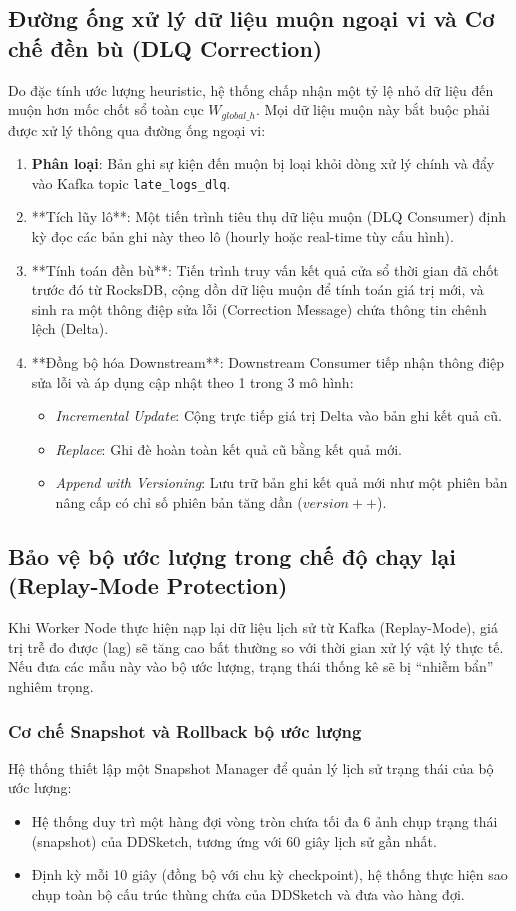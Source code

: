\documentclass[12pt,a4paper]{article}
\begin{document}
\subsection{Đường ống xử lý dữ liệu muộn ngoại vi và Cơ chế đền bù (DLQ Correction)}
Do đặc tính ước lượng heuristic, hệ thống chấp nhận một tỷ lệ nhỏ dữ liệu đến muộn hơn mốc chốt sổ toàn cục $W_{global\_h}$. Mọi dữ liệu muộn này bắt buộc phải được xử lý thông qua đường ống ngoại vi:
\begin{enumerate}
    \item \textbf{Phân loại}: Bản ghi sự kiện đến muộn bị loại khỏi dòng xử lý chính và đẩy vào Kafka topic \texttt{late\_logs\_dlq}.
    \item **Tích lũy lô**: Một tiến trình tiêu thụ dữ liệu muộn (DLQ Consumer) định kỳ đọc các bản ghi này theo lô (hourly hoặc real-time tùy cấu hình).
    \item **Tính toán đền bù**: Tiến trình truy vấn kết quả cửa sổ thời gian đã chốt trước đó từ RocksDB, cộng dồn dữ liệu muộn để tính toán giá trị mới, và sinh ra một thông điệp sửa lỗi (Correction Message) chứa thông tin chênh lệch (Delta).
    \item **Đồng bộ hóa Downstream**: Downstream Consumer tiếp nhận thông điệp sửa lỗi và áp dụng cập nhật theo 1 trong 3 mô hình:
        \begin{itemize}
            \item \textit{Incremental Update}: Cộng trực tiếp giá trị Delta vào bản ghi kết quả cũ.
            \item \textit{Replace}: Ghi đè hoàn toàn kết quả cũ bằng kết quả mới.
            \item \textit{Append with Versioning}: Lưu trữ bản ghi kết quả mới như một phiên bản nâng cấp có chỉ số phiên bản tăng dần ($version++$).
        \end{itemize}
\end{enumerate}

\subsection{Bảo vệ bộ ước lượng trong chế độ chạy lại (Replay-Mode Protection)}
Khi Worker Node thực hiện nạp lại dữ liệu lịch sử từ Kafka (Replay-Mode), giá trị trễ đo được (lag) sẽ tăng cao bất thường so với thời gian xử lý vật lý thực tế. Nếu đưa các mẫu này vào bộ ước lượng, trạng thái thống kê sẽ bị ``nhiễm bẩn'' nghiêm trọng.

\subsubsection{Cơ chế Snapshot và Rollback bộ ước lượng}
Hệ thống thiết lập một Snapshot Manager để quản lý lịch sử trạng thái của bộ ước lượng:
\begin{itemize}
    \item Hệ thống duy trì một hàng đợi vòng tròn chứa tối đa 6 ảnh chụp trạng thái (snapshot) của DDSketch, tương ứng với 60 giây lịch sử gần nhất.
    \item Định kỳ mỗi 10 giây (đồng bộ với chu kỳ checkpoint), hệ thống thực hiện sao chụp toàn bộ cấu trúc thùng chứa của DDSketch và đưa vào hàng đợi.
\end{itemize}
\end{document}
